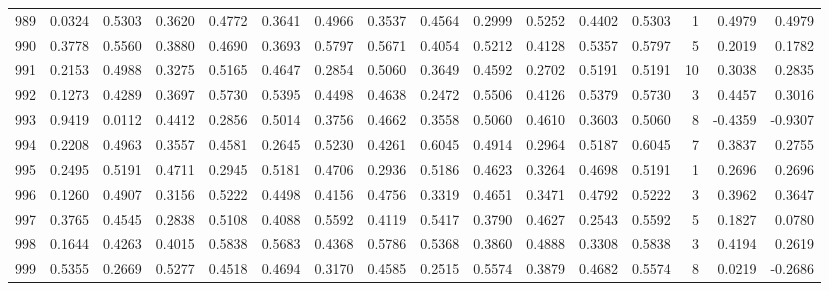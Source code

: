 \begin{tabular}{lrrrrrrrrrrrrrrr}
989 &      0.0324 &  0.5303 &  0.3620 &  0.4772 &  0.3641 &  0.4966 &  0.3537 &  0.4564 &  0.2999 &  0.5252 &   0.4402 &     0.5303 &      1 &                    0.4979 &                     0.4979 \\
990 &      0.3778 &  0.5560 &  0.3880 &  0.4690 &  0.3693 &  0.5797 &  0.5671 &  0.4054 &  0.5212 &  0.4128 &   0.5357 &     0.5797 &      5 &                    0.2019 &                     0.1782 \\
991 &      0.2153 &  0.4988 &  0.3275 &  0.5165 &  0.4647 &  0.2854 &  0.5060 &  0.3649 &  0.4592 &  0.2702 &   0.5191 &     0.5191 &     10 &                    0.3038 &                     0.2835 \\
992 &      0.1273 &  0.4289 &  0.3697 &  0.5730 &  0.5395 &  0.4498 &  0.4638 &  0.2472 &  0.5506 &  0.4126 &   0.5379 &     0.5730 &      3 &                    0.4457 &                     0.3016 \\
993 &      0.9419 &  0.0112 &  0.4412 &  0.2856 &  0.5014 &  0.3756 &  0.4662 &  0.3558 &  0.5060 &  0.4610 &   0.3603 &     0.5060 &      8 &                   -0.4359 &                    -0.9307 \\
994 &      0.2208 &  0.4963 &  0.3557 &  0.4581 &  0.2645 &  0.5230 &  0.4261 &  0.6045 &  0.4914 &  0.2964 &   0.5187 &     0.6045 &      7 &                    0.3837 &                     0.2755 \\
995 &      0.2495 &  0.5191 &  0.4711 &  0.2945 &  0.5181 &  0.4706 &  0.2936 &  0.5186 &  0.4623 &  0.3264 &   0.4698 &     0.5191 &      1 &                    0.2696 &                     0.2696 \\
996 &      0.1260 &  0.4907 &  0.3156 &  0.5222 &  0.4498 &  0.4156 &  0.4756 &  0.3319 &  0.4651 &  0.3471 &   0.4792 &     0.5222 &      3 &                    0.3962 &                     0.3647 \\
997 &      0.3765 &  0.4545 &  0.2838 &  0.5108 &  0.4088 &  0.5592 &  0.4119 &  0.5417 &  0.3790 &  0.4627 &   0.2543 &     0.5592 &      5 &                    0.1827 &                     0.0780 \\
998 &      0.1644 &  0.4263 &  0.4015 &  0.5838 &  0.5683 &  0.4368 &  0.5786 &  0.5368 &  0.3860 &  0.4888 &   0.3308 &     0.5838 &      3 &                    0.4194 &                     0.2619 \\
999 &      0.5355 &  0.2669 &  0.5277 &  0.4518 &  0.4694 &  0.3170 &  0.4585 &  0.2515 &  0.5574 &  0.3879 &   0.4682 &     0.5574 &      8 &                    0.0219 &                    -0.2686 \\
\bottomrule
\end{tabular}
